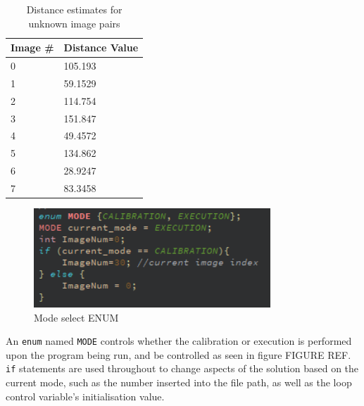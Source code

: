 \documentclass[conference]{IEEEtran}
\begin{document}
\begin{table}[]
\caption{Distance estimates for unknown image pairs}
\label{tab:t4_guesses}
\begin{tabular}{|l|l|}
\hline
\multicolumn{1}{|l|}{\textbf{Image \#}} & \textbf{Distance Value} \\	\hline
0                                       & 105.193                 \\	\hline
1                                       & 59.1529                 \\	\hline
2                                       & 114.754                 \\	\hline
3                                       & 151.847                 \\	\hline
4                                       & 49.4572                 \\	\hline
5                                       & 134.862                 \\	\hline
6                                       & 28.9247                 \\	\hline
7                                       & 83.3458                 \\	\hline
\end{tabular}
\end{table}

\begin{figure}[H]
\centering
\includegraphics[width=3.5in]{t4_enum}
\caption{Mode select ENUM}
\label{fig:mode}
\end{figure}

An \verb|enum| named \verb|MODE| controls whether the calibration or execution is performed upon the program being run, and be controlled as seen in figure FIGURE REF. \verb|if| statements are used throughout to change aspects of the solution based on the current mode, such as the number inserted into the file path, as well as the loop control variable's initialisation value.
\end{document}
